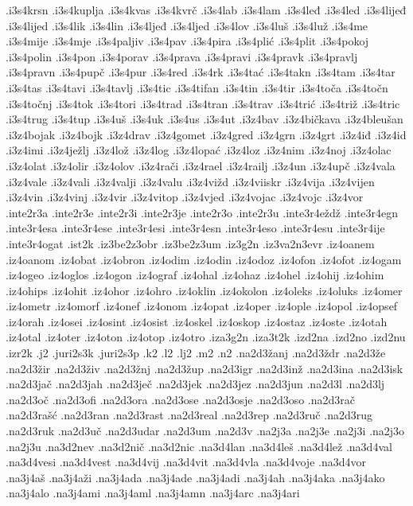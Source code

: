 {.i3s4krsn
.i3s4kuplja
.i3s4kvas
.i3s4kvrč
.i3s4lab
.i3s4lam
.i3s4leđ
.i3s4led
.i3s4lijeđ
.i3s4lijed
.i3s4lik
.i3s4lin
.i3s4ljeđ
.i3s4ljed
.i3s4lov
.i3s4luš
.i3s4luž
.i3s4me
.i3s4mije
.i3s4mje
.i3s4paljiv
.i3s4pav
.i3s4pira
.i3s4plić
.i3s4plit
.i3s4pokoj
.i3s4polin
.i3s4pon
.i3s4porav
.i3s4prava
.i3s4pravi
.i3s4pravk
.i3s4pravlj
.i3s4pravn
.i3s4pupč
.i3s4pur
.i3s4red
.i3s4rk
.i3s4tać
.i3s4takn
.i3s4tam
.i3s4tar
.i3s4tas
.i3s4tavi
.i3s4tavlj
.i3s4tic
.i3s4tifan
.i3s4tin
.i3s4tir
.i3s4toča
.i3s4točn
.i3s4točnj
.i3s4tok
.i3s4tori
.i3s4trad
.i3s4tran
.i3s4trav
.i3s4trić
.i3s4triž
.i3s4tric
.i3s4trug
.i3s4tup
.i3s4uš
.i3s4uk
.i3s4us
.i3s4ut
.i3z4bav
.i3z4bičkava
.i3z4bleušan
.i3z4bojak
.i3z4bojk
.i3z4drav
.i3z4gomet
.i3z4gred
.i3z4grn
.i3z4grt
.i3z4iđ
.i3z4id
.i3z4imi
.i3z4ježlj
.i3z4lož
.i3z4log
.i3z4lopać
.i3z4loz
.i3z4nim
.i3z4noj
.i3z4olac
.i3z4olat
.i3z4olir
.i3z4olov
.i3z4rači
.i3z4rael
.i3z4railj
.i3z4un
.i3z4upč
.i3z4vala
.i3z4vale
.i3z4vali
.i3z4valji
.i3z4valu
.i3z4vižd
.i3z4viiskr
.i3z4vija
.i3z4vijen
.i3z4vin
.i3z4vinj
.i3z4vir
.i3z4vitop
.i3z4vjed
.i3z4vojac
.i3z4vojc
.i3z4vor
.inte2r3a
.inte2r3e
.inte2r3i
.inte2r3je
.inte2r3o
.inte2r3u
.inte3r4eždž
.inte3r4egn
.inte3r4esa
.inte3r4ese
.inte3r4esi
.inte3r4esn
.inte3r4eso
.inte3r4esu
.inte3r4ije
.inte3r4ogat
.ist2k
.iz3be2z3obr
.iz3be2z3um
.iz3g2n
.iz3va2n3evr
.iz4oanem
.iz4oanom
.iz4obat
.iz4obron
.iz4odim
.iz4odin
.iz4odoz
.iz4ofon
.iz4ofot
.iz4ogam
.iz4ogeo
.iz4oglos
.iz4ogon
.iz4ograf
.iz4ohal
.iz4ohaz
.iz4ohel
.iz4ohij
.iz4ohim
.iz4ohips
.iz4ohit
.iz4ohor
.iz4ohro
.iz4oklin
.iz4okolon
.iz4oleks
.iz4oluks
.iz4omer
.iz4ometr
.iz4omorf
.iz4onef
.iz4onom
.iz4opat
.iz4oper
.iz4ople
.iz4opol
.iz4opsef
.iz4orah
.iz4osei
.iz4osint
.iz4osist
.iz4oskel
.iz4oskop
.iz4ostaz
.iz4oste
.iz4otah
.iz4otal
.iz4oter
.iz4oton
.iz4otop
.iz4otro
.iza3g2n
.iza3t2k
.izd2na
.izd2no
.izd2nu
.izr2k
.j2
.juri2s3k
.juri2s3p
.k2
.l2
.lj2
.m2
.n2
.na2d3žanj
.na2d3ždr
.na2d3že
.na2d3žir
.na2d3živ
.na2d3žnj
.na2d3žup
.na2d3igr
.na2d3inž
.na2d3ina
.na2d3isk
.na2d3jač
.na2d3jah
.na2d3ječ
.na2d3jek
.na2d3jez
.na2d3jun
.na2d3l
.na2d3lj
.na2d3oč
.na2d3ofi
.na2d3ora
.na2d3ose
.na2d3osje
.na2d3oso
.na2d3rač
.na2d3rašć
.na2d3ran
.na2d3rast
.na2d3real
.na2d3rep
.na2d3ruč
.na2d3rug
.na2d3ruk
.na2d3uč
.na2d3udar
.na2d3um
.na2d3v
.na2j3a
.na2j3e
.na2j3i
.na2j3o
.na2j3u
.na3d2nev
.na3d2nič
.na3d2nic
.na3d4lan
.na3d4leš
.na3d4lež
.na3d4val
.na3d4vesi
.na3d4vest
.na3d4vij
.na3d4vit
.na3d4vla
.na3d4voje
.na3d4vor
.na3j4aš
.na3j4aži
.na3j4ada
.na3j4ade
.na3j4adi
.na3j4ah
.na3j4aka
.na3j4ako
.na3j4alo
.na3j4ami
.na3j4aml
.na3j4amn
.na3j4arc
.na3j4ari
}
